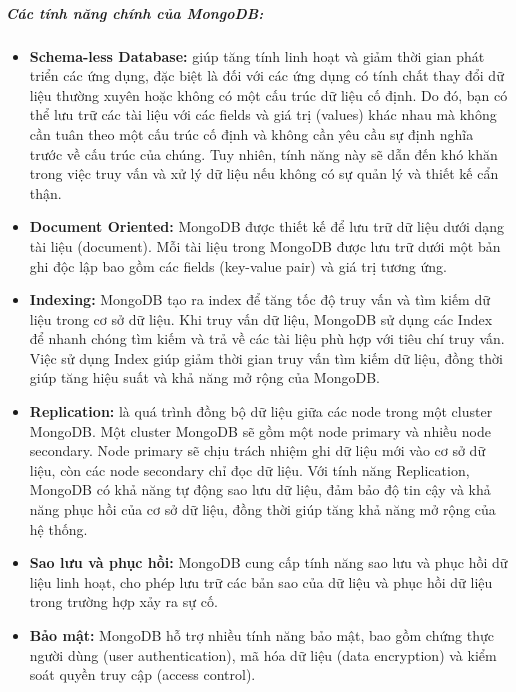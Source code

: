 \subparagraph{Các tính năng chính của MongoDB:}
\begin{itemize}
    \item \textbf{Schema-less Database:} giúp tăng tính linh hoạt và giảm thời gian phát triển các ứng dụng, đặc biệt là đối với các ứng dụng có tính chất thay đổi dữ liệu thường xuyên hoặc không có một cấu trúc dữ liệu cố định. Do đó, bạn có thể lưu trữ các tài liệu với các fields và giá trị (values) khác nhau mà không cần tuân theo một cấu trúc cố định và không cần yêu cầu sự định nghĩa trước về cấu trúc của chúng. Tuy nhiên, tính năng này sẽ dẫn đến khó khăn trong việc truy vấn và xử lý dữ liệu nếu không có sự quản lý và thiết kế cẩn thận.
    \item \textbf{Document Oriented:} MongoDB được thiết kế để lưu trữ dữ liệu dưới dạng tài liệu (document). Mỗi tài liệu trong MongoDB được lưu trữ dưới một bản ghi độc lập bao gồm các fields (key-value pair) và giá trị tương ứng.
    \item \textbf{Indexing:} MongoDB tạo ra index để tăng tốc độ truy vấn và tìm kiếm dữ liệu trong cơ sở dữ liệu. Khi truy vấn dữ liệu, MongoDB sử dụng các Index để nhanh chóng tìm kiếm và trả về các tài liệu phù hợp với tiêu chí truy vấn. Việc sử dụng Index giúp giảm thời gian truy vấn tìm kiếm dữ liệu, đồng thời giúp tăng hiệu suất và khả năng mở rộng của MongoDB.
    \item \textbf{Replication:} là quá trình đồng bộ dữ liệu giữa các node trong một cluster MongoDB. Một cluster MongoDB sẽ gồm một node primary và nhiều node secondary. Node primary sẽ chịu trách nhiệm ghi dữ liệu mới vào cơ sở dữ liệu, còn các node secondary chỉ đọc dữ liệu. Với tính năng Replication, MongoDB có khả năng tự động sao lưu dữ liệu, đảm bảo độ tin cậy và khả năng phục hồi của cơ sở dữ liệu, đồng thời giúp tăng khả năng mở rộng của hệ thống.
    \item \textbf{Sao lưu và phục hồi:} MongoDB cung cấp tính năng sao lưu và phục hồi dữ liệu linh hoạt, cho phép lưu trữ các bản sao của dữ liệu và phục hồi dữ liệu trong trường hợp xảy ra sự cố.
    \item \textbf{Bảo mật:} MongoDB hỗ trợ nhiều tính năng bảo mật, bao gồm chứng thực người dùng (user authentication), mã hóa dữ liệu (data encryption) và kiểm soát quyền truy cập (access control).
\end{itemize}

